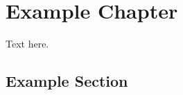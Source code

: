 \section{Example Chapter}\label{chapter.example}
\thispagestyle{plain}

Text here.

\subsection{Example Section}\label{section.example}